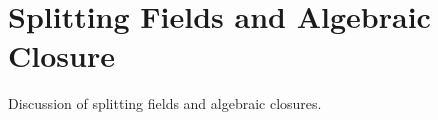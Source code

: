 \section{Splitting Fields and Algebraic Closure}
\label{sec:splitting-algebraic-closure}

Discussion of splitting fields and algebraic closures.
